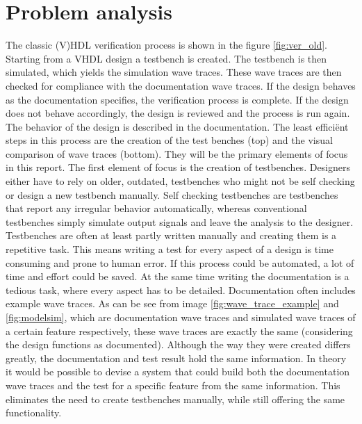 
\chapter{Problem analysis}\label{PA}%
The classic (V)HDL verification process is shown in the figure \ref{fig:ver_old}. Starting from a VHDL design a testbench is created. The testbench is then simulated, which yields the simulation wave traces. These wave traces are then checked for compliance with the documentation wave traces. If the design behaves as the documentation specifies, the verification process is complete. If the design does not behave accordingly, the design is reviewed and the process is run again. The behavior of the design is described in the documentation.
\npar
The least efficiënt steps in this process are the creation of the test benches (top) and the visual comparison of wave traces (bottom). They will be the primary elements of focus in this report.
\npar
The first element of focus is the creation of testbenches. Designers either have to rely on older, outdated, testbenches who might not be self checking or design a new testbench manually. Self checking testbenches are testbenches that report any irregular behavior automatically, whereas conventional testbenches simply simulate output signals and leave the analysis to the designer. Testbenches are often at least partly written manually and creating them is a repetitive task. This means writing a test for every aspect of a design is time consuming and prone to human error. If this process could be automated, a lot of time and effort could be saved. At the same time writing the documentation is a tedious task, where every aspect has to be detailed. Documentation often includes example wave traces. As can be see from image \ref{fig:wave_trace_example} and \ref{fig:modelsim}, which are documentation wave traces and simulated wave traces of a certain feature respectively, these wave traces are exactly the same (considering the design functions as documented). Although the way they were created differs greatly, the documentation and test result hold the same information. In theory it would be possible to devise a system that could build both the documentation wave traces and the test for a specific feature from the same information. This eliminates the need to create testbenches manually, while still offering the same functionality.%
